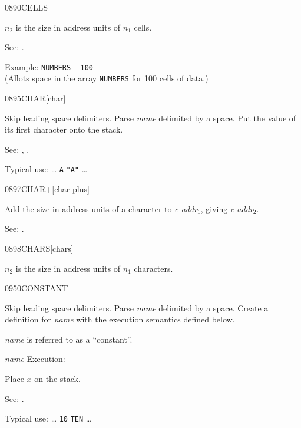\begin{newword}{0890}{CELLS}

	$n_2$ is the size in address units of $n_1$ cells.

	\begin{rationale} %
		See: .

		Example:
			 \texttt{NUMBERS} ~
			\texttt{100}   \\
		(Allots space in the array \texttt{NUMBERS} for 100 cells
		of data.)
	\end{rationale}
\end{newword}


\begin{newword}{0895}{CHAR}[char]

	Skip leading space delimiters. Parse \emph{name} delimited by
	a space. Put the value of its first character onto the stack.

\item[See:]
	,
	.

	\begin{rationale} %
		Typical use: {\ldots}
			 \texttt{A}  \texttt{"A"} {\ldots}
	\end{rationale}
\end{newword}


\begin{newword}{0897}{CHAR+}[char-plus]

	Add the size in address units of a character to
	\emph{c-addr}$_1$, giving \emph{c-addr}$_2$.

\item[See:]
	.
\end{newword}


\begin{newword}{0898}{CHARS}[chars]

	$n_2$ is the size in address units of $n_1$ characters.
\end{newword}


\begin{newword}{0950}{CONSTANT}

	Skip leading space delimiters. Parse \emph{name} delimited by
	a space. Create a definition for \emph{name} with the execution
	semantics defined below.

	\emph{name} is referred to as a ``constant''.

\item[\emph{name} Execution:]

	Place $x$ on the stack.

\item[See:]
	.

	\begin{rationale} %
		Typical use: {\ldots}
			 \texttt{10}  \texttt{TEN}
		{\ldots}
	\end{rationale}
\end{newword}


